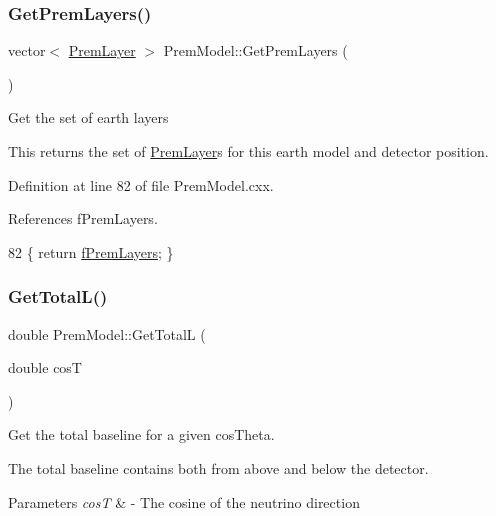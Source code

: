 \subsubsection{\texorpdfstring{Get\+Prem\+Layers()}{GetPremLayers()}}
{\footnotesize\ttfamily vector$<$ \hyperlink{structOscProb_1_1PremLayer}{Prem\+Layer} $>$ Prem\+Model\+::\+Get\+Prem\+Layers (\begin{DoxyParamCaption}{ }\end{DoxyParamCaption})\hspace{0.3cm}{\ttfamily [virtual]}}

Get the set of earth layers

This returns the set of \hyperlink{structOscProb_1_1PremLayer}{Prem\+Layer}\textquotesingle{}s for this earth model and detector position. 

Definition at line 82 of file Prem\+Model.\+cxx.



References f\+Prem\+Layers.


\begin{DoxyCode}
82 \{ \textcolor{keywordflow}{return} \hyperlink{classOscProb_1_1PremModel_a19a9a3b23ec154ad7a29f92b74aa5bc6}{fPremLayers}; \}
\end{DoxyCode}
\mbox{\label{classOscProb_1_1PremModel_ae258b41cca80631e3041f0421b25afeb}} 
\subsubsection{\texorpdfstring{Get\+Total\+L()}{GetTotalL()}}
{\footnotesize\ttfamily double Prem\+Model\+::\+Get\+TotalL (\begin{DoxyParamCaption}\item[{double}]{cosT }\end{DoxyParamCaption})\hspace{0.3cm}{\ttfamily [virtual]}}

Get the total baseline for a given cos\+Theta.

The total baseline contains both from above and below the detector.


\begin{DoxyParams}{Parameters}
{\em cosT} & -\/ The cosine of the neutrino direction \\
\hline
\end{DoxyParams}


